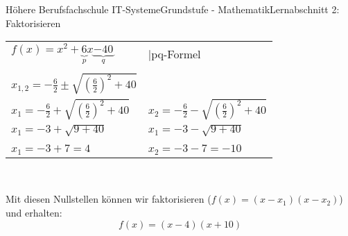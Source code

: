 \documentclass[11pt,twocolumn,oneside,openany,headings=optiontotoc,11pt,numbers=noenddot]{article}
\begin{document}
\begin{worksheet}{Höhere Berufsfachschule IT-Systeme}{Grundstufe - Mathematik}{Lernabschnitt 2: Faktorisieren}
		\par\noindent
		\begin{tabularx}{0.5\textwidth}{Xl}
			\(f(x) = x^2 + \underbrace{6}_{p}x \underbrace{- 40}_{q}\) &  |pq-Formel\\
			\\
			\(x_{1,2} = -\frac{6}{2} \pm \sqrt{\left(\frac{6}{2}\right)^2 +40}\)\\
			\(x_1 = -\frac{6}{2} + \sqrt{\left(\frac{6}{2}\right)^2 +40}\) & \(x_2 = -\frac{6}{2} - \sqrt{\left(\frac{6}{2}\right)^2 +40}\)\\
			\(x_1 = - 3 + \sqrt{9 + 40}\) & \(x_1 = - 3 - \sqrt{9 + 40}\)\\
			\\
			\colorbox{green!10}{\(x_1 = -3 + 7 = 4\)} & \colorbox{green!10}{\(x_2 = -3 - 7 = -10\)}
		\end{tabularx}\\
		\par\noindent
		Mit diesen Nullstellen können wir faktorisieren (\(f(x) = (x-x_1)(x-x_2)\)) und erhalten:
		\[f(x) = (x-4)(x+10)\]
	\end{worksheet}
\end{document}
